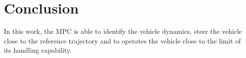 \section{Conclusion}

In this work, the MPC is able to identify the vehicle dynamics, steer the vehicle close to the reference trajectory and to operates the vehicle close to the limit of its handling capability.
